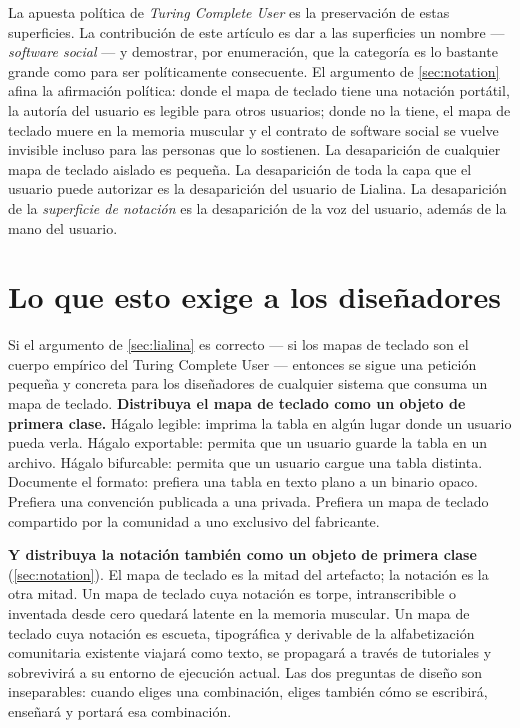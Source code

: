 \documentclass[10pt,letterpaper,twocolumn]{article}
\begin{document}
La apuesta política de \emph{Turing Complete User} es la preservación de estas superficies. La contribución de este artículo es dar a las superficies un nombre --- \emph{software social} --- y demostrar, por enumeración, que la categoría es lo bastante grande como para ser políticamente consecuente. El argumento de \textsection\ref{sec:notation} afina la afirmación política: donde el mapa de teclado tiene una notación portátil, la autoría del usuario es legible para otros usuarios; donde no la tiene, el mapa de teclado muere en la memoria muscular y el contrato de software social se vuelve invisible incluso para las personas que lo sostienen. La desaparición de cualquier mapa de teclado aislado es pequeña. La desaparición de toda la capa que el usuario puede autorizar es la desaparición del usuario de Lialina. La desaparición de la \emph{superficie de notación} es la desaparición de la voz del usuario, además de la mano del usuario.

\section{Lo que esto exige a los diseñadores}
\label{sec:design}

Si el argumento de \textsection\ref{sec:lialina} es correcto --- si los mapas de teclado son el cuerpo empírico del Turing Complete User --- entonces se sigue una petición pequeña y concreta para los diseñadores de cualquier sistema que consuma un mapa de teclado. \textbf{Distribuya el mapa de teclado como un objeto de primera clase.} Hágalo legible: imprima la tabla en algún lugar donde un usuario pueda verla. Hágalo exportable: permita que un usuario guarde la tabla en un archivo. Hágalo bifurcable: permita que un usuario cargue una tabla distinta. Documente el formato: prefiera una tabla en texto plano a un binario opaco. Prefiera una convención publicada a una privada. Prefiera un mapa de teclado compartido por la comunidad a uno exclusivo del fabricante.

\textbf{Y distribuya la notación también como un objeto de primera clase} (\textsection\ref{sec:notation}). El mapa de teclado es la mitad del artefacto; la notación es la otra mitad. Un mapa de teclado cuya notación es torpe, intranscribible o inventada desde cero quedará latente en la memoria muscular. Un mapa de teclado cuya notación es escueta, tipográfica y derivable de la alfabetización comunitaria existente viajará como texto, se propagará a través de tutoriales y sobrevivirá a su entorno de ejecución actual. Las dos preguntas de diseño son inseparables: cuando eliges una combinación, eliges también cómo se escribirá, enseñará y portará esa combinación.
\end{document}
